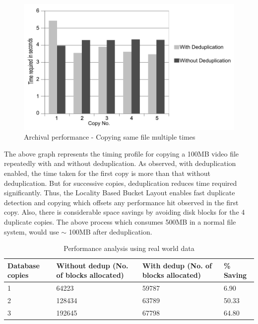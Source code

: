 \documentclass[final]{ols}
\begin{document}
\begin{figure}[H]
\begin{center}
\includegraphics[width=1.1\columnwidth]{images/perf_graph}
\caption{Archival performance - Copying same file multiple times} 
\end{center}
\end{figure}
The above graph represents the timing profile for copying a 100MB video file repeatedly with and without deduplication. As observed, with deduplication enabled, the time taken for the first copy is more than that without deduplication. But for successive copies, deduplication reduces time required significantly. Thus, the Locality Based Bucket Layout enables fast duplicate detection and copying which offsets any performance hit observed in the first copy. Also, there is considerable space savings by avoiding disk blocks for the 4 duplicate copies. The above process which consumes 500MB in a normal file system, would use $\sim$ 100MB after deduplication.

\begin{table}[!th]
\centering
\begin{tabular}{| m{1.5cm} | m{1.5cm} | m{1.5cm} | m{1.5cm}|}
\hline
Database copies & Without dedup (No. of blocks allocated) & With dedup (No. of blocks allocated) & \% Saving \tabularnewline
\hline
1               & 64223                                   & 59787                                & 6.90\tabularnewline
\hline
2               & 128434                                  & 63789                                & 50.33\tabularnewline
\hline
3               & 192645                                  & 67798                                & 64.80\tabularnewline
\hline
\end{tabular}
\caption{Performance analysis using real world data}
\label{db-perf}
\end{table}
\end{document}
